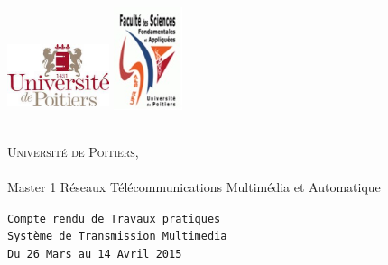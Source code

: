 

\begin{titlepage}
\begin{center}
\includegraphics[height=30mm,width=30mm]{logo.jpg} %
\hfill%
\includegraphics[height=40mm,width=20mm]{logo_sfa.jpg}\\
\end{center}
\vspace*{1cm}



\begin{center}
\textsc{Universit\'e de Poitiers,}\paragraph{}
 Master 1 Réseaux Télécommunications Multimédia et Automatique
\end{center}


\begin{center}
\texttt{Compte rendu de Travaux pratiques\\ Système de Transmission Multimedia}\\
\texttt{Du 26 Mars au 14 Avril 2015} %
\end{center}
\vspace*{2cm}
 




\end{titlepage}

